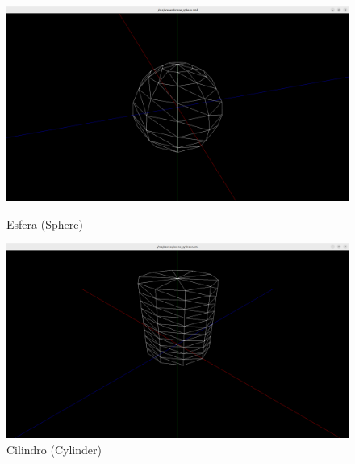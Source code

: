 \documentclass[12pt, a4paper]{article}
\begin{document}
\begin{figure}[h]
    \centering
    \begin{minipage}{0.48\textwidth}
        \centering
        \includegraphics[width=\textwidth]{res/results/Sphere.png}
        \caption{Esfera (Sphere)}
        \label{fig:imageSphere}
    \end{minipage}\hfill
    \begin{minipage}{0.48\textwidth}
        \centering
        \includegraphics[width=\textwidth]{res/results/Cylinder.png}
        \caption{Cilindro (Cylinder)}
        \label{fig:imageCylinder}
    \end{minipage}
\end{figure}
\end{document}

